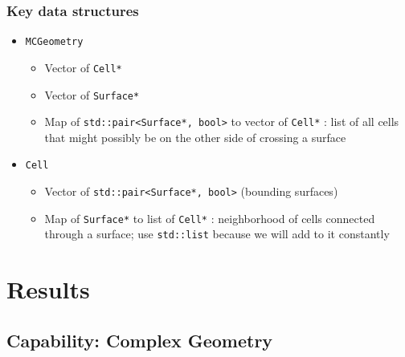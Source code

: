 \documentclass{beamer}
\begin{document}
\begin{frame}
\frametitle{Key data structures}
\begin{itemize}
  \item \texttt{MCGeometry}
    \begin{itemize}
      \item Vector of \texttt{Cell*}
      \item Vector of \texttt{Surface*}
      \item Map of \texttt{std::pair<Surface*, bool>} to 
        vector of \texttt{Cell*} : list of all cells that might possibly be on
        the other side of crossing a surface
    \end{itemize}
  \item \texttt{Cell}
    \begin{itemize}
      \item Vector of \texttt{std::pair<Surface*, bool>} (bounding surfaces)
      \item Map of \texttt{Surface*} to list of \texttt{Cell*} : 
        neighborhood of cells connected through a surface; use
        \texttt{std::list} because we will add to it constantly
    \end{itemize}
\end{itemize}
\end{frame}

\section{Results}
\subsection{Capability: Complex Geometry}
\end{document}
